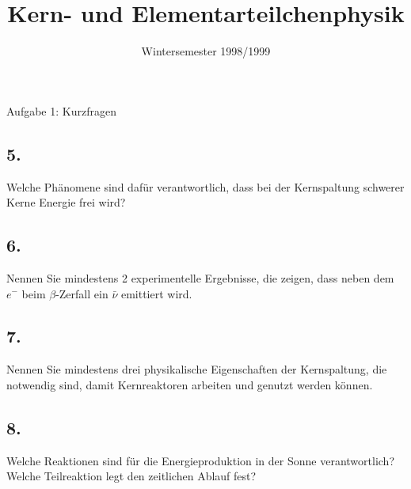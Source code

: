

\subject{KET}
\title{Kern- und Elementarteilchenphysik}
\date{
    Wintersemester 1998/1999
}



\maketitle
\thispagestyle{empty}
\newpage


\begin{aufgabe}{Aufgabe 1: Kurzfragen}

    \subsection{5.}
    Welche Phänomene sind dafür verantwortlich, dass bei der Kernspaltung schwerer Kerne Energie frei wird?

    \subsection{6.}
    Nennen Sie mindestens 2 experimentelle Ergebnisse, die zeigen,
    dass neben dem $e^-$ beim $\beta$-Zerfall ein $\bar\nu$ emittiert wird.

    \subsection{7.}
    Nennen Sie mindestens drei physikalische Eigenschaften der Kernspaltung,
    die notwendig sind, damit Kernreaktoren arbeiten und genutzt werden können.

    \subsection{8.}
    Welche Reaktionen sind für die Energieproduktion in der Sonne verantwortlich?
    Welche Teilreaktion legt den zeitlichen Ablauf fest?


\end{aufgabe}
